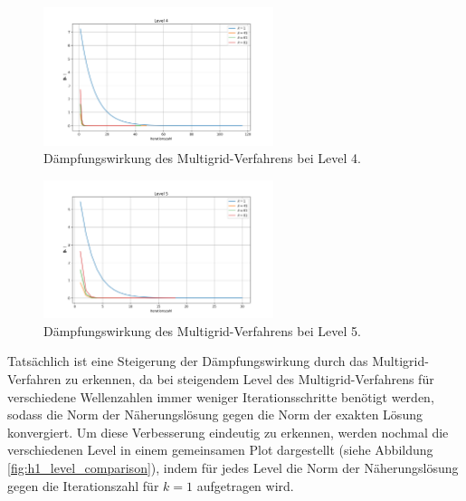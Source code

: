 \documentclass[11pt,a4paper]{article}
\begin{document}
\begin{figure}[htbp]
    \centering
    \includegraphics[width=0.6\textwidth,scale=0.7]{h1_level4}
    \caption[Dämpfungswirkung des Multigrid-Verfahrens bei Level 4.]{Dämpfungswirkung des Multigrid-Verfahrens bei Level 4.}\label{fig:h1_level4}
\end{figure}
\begin{figure}[htbp]
    \centering
    \includegraphics[width=0.6\textwidth,scale=0.7]{h1_level5}
    \caption[Dämpfungswirkung des Multigrid-Verfahrens bei Level 5.]{Dämpfungswirkung des Multigrid-Verfahrens bei Level 5.}\label{fig:h1_level5}
\end{figure} Tatsächlich ist eine Steigerung der Dämpfungswirkung durch das Multigrid-Verfahren zu erkennen, da bei steigendem Level des Multigrid-Verfahrens für verschiedene Wellenzahlen immer weniger Iterationsschritte benötigt werden, sodass die Norm der Näherungslösung
gegen die Norm der exakten Lösung konvergiert. Um diese Verbesserung eindeutig zu erkennen, werden nochmal die verschiedenen Level in einem gemeinsamen Plot dargestellt (siehe Abbildung \ref{fig:h1_level_comparison}), indem für jedes Level die Norm der Näherungslösung gegen die Iterationszahl für $k = 1$ aufgetragen wird.
\end{document}
